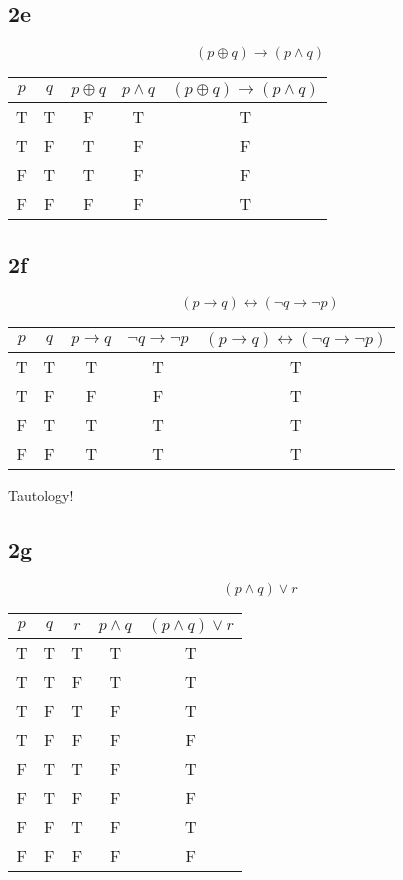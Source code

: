 \documentclass[letterpaper, 12pt]{math}
\begin{document}
\subsection*{2e}
\[ (p \oplus q) \to (p \wedge q) \]
\begin{center}
  \begin{tabular}{|c|c|c|c|c|}
    \hline
    \( p \) & \( q \) & \( p \oplus q \) & \( p \wedge q \) &
        \( (p \oplus q) \to (p \wedge q) \) \\ \hline
    T & T & F & T & T \\ \hline
    T & F & T & F & F \\ \hline
    F & T & T & F & F \\ \hline
    F & F & F & F & T \\ \hline
  \end{tabular}
\end{center}

\subsection*{2f}
\[ (p \to q) \leftrightarrow (\neg{q} \to \neg{p}) \]
\begin{center}
  \begin{tabular}{|c|c|c|c|c|}
    \hline
    \( p \) & \( q \) & \( p \to q \) & \( \neg{q} \to \neg{p} \) &
        \( (p \to q) \leftrightarrow (\neg{q} \to \neg{p}) \) \\ \hline
    T & T & T & T & T \\ \hline
    T & F & F & F & T \\ \hline
    F & T & T & T & T \\ \hline
    F & F & T & T & T \\ \hline
  \end{tabular}
\end{center}
Tautology!

\subsection*{2g}
\[ (p \wedge q) \vee r \]
\begin{center}
  \begin{tabular}{|c|c|c|c|c|}
    \hline
    \( p \) & \( q \) & \( r \) & \( p \wedge q \) & \( (p \wedge q) \vee r \)
        \\ \hline
    T & T & T & T & T \\ \hline
    T & T & F & T & T \\ \hline
    T & F & T & F & T \\ \hline
    T & F & F & F & F \\ \hline
    F & T & T & F & T \\ \hline
    F & T & F & F & F \\ \hline
    F & F & T & F & T \\ \hline
    F & F & F & F & F \\ \hline
  \end{tabular}
\end{center}
\end{document}
